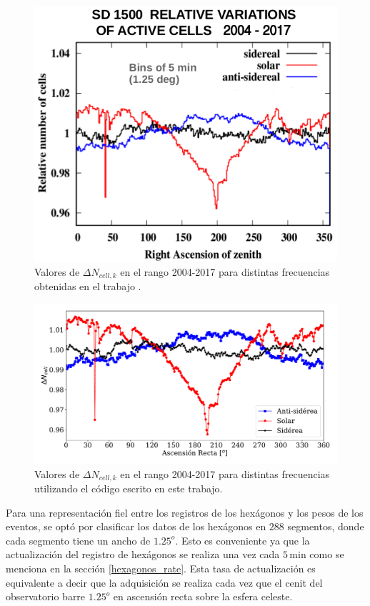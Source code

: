       \begin{figure}[H]
          \centering
              \includegraphics[width=0.6\linewidth]{pesos_referencia.png}  
              \caption{Valores de $\Delta N_{cell, k}$ en el rango 2004-2017 para distintas frecuencias obtenidas en el trabajo \cite{referencia_pesos}.}
              \label{fig:pesos_referencia}
        \end{figure}

       \begin{figure}[H]
          \centering
              \includegraphics[width=0.8\linewidth]{weigths_2004-2017.pdf}
              \caption{Valores de $\Delta N_{cell, k}$ en el rango 2004-2017 para distintas frecuencias utilizando el código escrito en este trabajo.}
              \label{fig:pesos_ejemplo}
        \end{figure}

    Para una representación fiel entre los registros de los hexágonos y los pesos de los eventos, se optó por clasificar los datos de los hexágonos en $288$ segmentos, donde cada segmento tiene un ancho de $1.25^o$. Esto es conveniente ya que la actualización del registro de hexágonos se realiza una vez  cada $5\,$min como se menciona en la sección \ref{hexagonos_rate}. Esta tasa de actualización es equivalente a decir que la adquisición se realiza cada vez que el cenit del observatorio barre  $1.25^o$ en ascensión recta sobre la esfera celeste.


